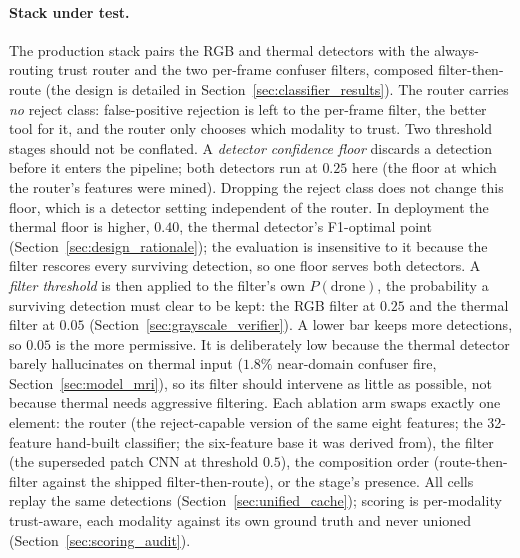 \paragraph{Stack under test.}
The production stack pairs the RGB and thermal detectors with the always-routing trust router and the two per-frame confuser filters, composed filter-then-route (the design is detailed in Section~\ref{sec:classifier_results}). The router carries \emph{no} reject class: false-positive rejection is left to the per-frame filter, the better tool for it, and the router only chooses which modality to trust. Two threshold stages should not be conflated. A \emph{detector confidence floor} discards a detection before it enters the pipeline; both detectors run at $0.25$ here (the floor at which the router's features were mined). Dropping the reject class does not change this floor, which is a detector setting independent of the router. In deployment the thermal floor is higher, $0.40$, the thermal detector's F1-optimal point (Section~\ref{sec:design_rationale}); the evaluation is insensitive to it because the filter rescores every surviving detection, so one floor serves both detectors. A \emph{filter threshold} is then applied to the filter's own $P(\text{drone})$, the probability a surviving detection must clear to be kept: the RGB filter at $0.25$ and the thermal filter at $0.05$ (Section~\ref{sec:grayscale_verifier}). A lower bar keeps more detections, so $0.05$ is the more permissive. It is deliberately low because the thermal detector barely hallucinates on thermal input ($1.8\%$ near-domain confuser fire, Section~\ref{sec:model_mri}), so its filter should intervene as little as possible, not because thermal needs aggressive filtering. Each ablation arm swaps exactly one element: the router (the reject-capable version of the same eight features; the 32-feature hand-built classifier; the six-feature base it was derived from), the filter (the superseded patch CNN at threshold $0.5$), the composition order (route-then-filter against the shipped filter-then-route), or the stage's presence. All cells replay the same detections (Section~\ref{sec:unified_cache}); scoring is per-modality trust-aware, each modality against its own ground truth and never unioned (Section~\ref{sec:scoring_audit}).

